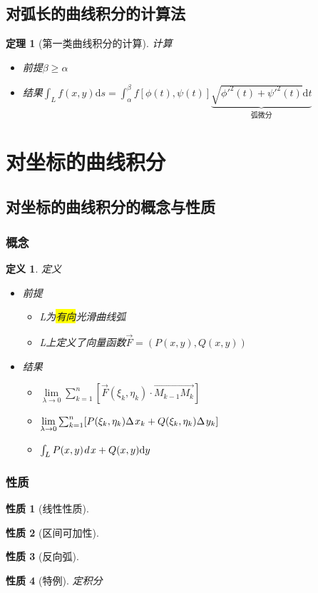 \documentclass[UTF8,a4paper,12pt,scheme=chinese]{ctexbook}
\newcommand{\ud}{\mathrm{d}}
\newcommand{\hl}[1]{\colorbox{yellow}{#1}}
\newtheorem{theorem}{定理}[section]
\theoremstyle{plain}
\newtheorem{definition}{定义}[section]
\newtheorem{property}{性质}[subsection]
\begin{document}
	\subsection{对弧长的曲线积分的计算法}
	\begin{theorem}[第一类曲线积分的计算]
		计算
		\begin{itemize}
			\item 前提\quad$ \beta\geqslant\alpha $
			\item 结果\quad$ \int_L {f(x,y) \ud s}  = \int_\alpha ^\beta  f[\phi (t),\psi (t)]
				\underbrace{\sqrt {{{\phi '}^2}(t) + {{\psi '}^2}(t)}  \ud t}
			_{\mbox{弧微分}}
			$
		\end{itemize}
	\end{theorem}
	\section{对坐标的曲线积分}
	\subsection{对坐标的曲线积分的概念与性质}
	\subsubsection{概念}
	\begin{definition}定义
		\begin{itemize}
			\item 前提
			\begin{itemize}
				\item L为\hl{有向}光滑曲线弧
				\item L上定义了向量函数$ \overrightarrow{F}=(P(x,y),Q(x,y))  $
			\end{itemize}
		\item 结果
		\begin{itemize}
			\item $ \lim\limits_{\lambda\rightarrow0}\sum_{k=1}^{n}[\overrightarrow{F}(\xi _k,\eta _k) \cdot \overrightarrow{{M_{k - 1}}{M_k}}] $
			\item $ \lim\limits_{\lambda\rightarrow0}\sum_{k=1}^{n}[P({\xi _k},{\eta _k})\Delta {\kern 1pt} {x_k} + Q({\xi _k},{\eta _k})\Delta {\kern 1pt} {y_k}] $
			\item $\int_L {P(x,y){\kern 1pt} d{\kern 1pt} x + Q(x,y)\ud y} $
		\end{itemize}
		\end{itemize}
	\end{definition}
	\subsubsection{性质}
	\begin{property}[线性性质]
	\end{property}
	\begin{property}[区间可加性]
	\end{property}
	\begin{property}[反向弧]
	\end{property}
	\begin{property}[特例]
		定积分
	\end{property}
\end{document}
